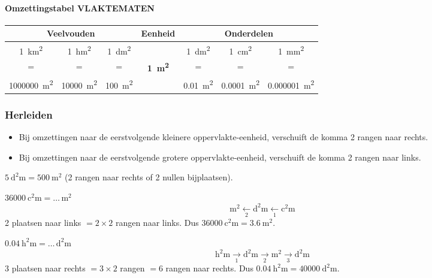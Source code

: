 \documentclass{bis}
\begin{document}
\paragraph{Omzettingstabel VLAKTEMATEN}
\begin{center}
\renewcommand{\arraystretch}{1.2}\setlength{\tabcolsep}{4pt}%
\begin{tabular}{*{7}{c}}
  \multicolumn{3}{c}{\textbf{Veelvouden}} & \textbf{Eenheid} & \multicolumn{3}{c}{\textbf{Onderdelen}}\\
  \midrule
\SI{1}{\square\kilo\metre} & \SI{1}{\square\hecto\metre} & \SI{1}{\square\deca\metre} &  & \SI{1}{\square\deci\metre} & \SI{1}{\square\centi\metre} & \SI{1}{\square\milli\metre}\\
= & = & = & \textbf{\SI{1}{\square\metre}} & = & = & =\\
\SI{1000000}{\square\metre} & \SI{10000}{\square\metre} & \SI{100}{\square\metre} & & \SI{0.01}{\square\metre} & \SI{0.0001}{\square\metre} & \SI{0.000001}{\square\metre}
\end{tabular}%
\end{center}

\subsubsection{Herleiden}
\begin{itemize}
  \item Bij omzettingen naar de eerstvolgende kleinere oppervlakte-eenheid, verschuift de komma 2 rangen naar rechts.
  \item Bij omzettingen naar de eerstvolgende grotere oppervlakte-eenheid, verschuift de komma 2 rangen naar links.
\end{itemize}

\begin{voorbeeld}
\(\SI{5}{\square\deca\metre}=\SI{500}{\square\metre}\) (2 rangen naar rechts of 2 nullen bijplaatsen).
\end{voorbeeld}

\begin{voorbeeld}
\(\SI{36000}{\square\centi\metre}=\ldots\,\si{\square\metre}\)
\[
\si{\square\metre} \xleftarrow[2]{}\si{\square\deci\metre} \xleftarrow[1]{}\si{\square\centi\metre}
\]
2 plaatsen naar links \(=2\times2\) rangen naar links. Dus \(\SI{36000}{\square\centi\metre}=\SI{3.6}{\square\metre}\).
\end{voorbeeld}

\begin{voorbeeld}
\(\SI{0.04}{\square\hecto\metre}=\ldots\,\si{\square\deci\metre}\)
\[
\si{\square\hecto\metre} \xrightarrow[1]{}\si{\square\deca\metre} \xrightarrow[2]{}\si{\square\metre} \xrightarrow[3]{}\si{\square\deci\metre}
\]
3 plaatsen naar rechts \(=3\times2\) rangen \(=6\) rangen naar rechts. Dus \(\SI{0.04}{\square\hecto\metre}=\SI{40000}{\square\deci\metre}\).
\end{voorbeeld}
\end{document}
